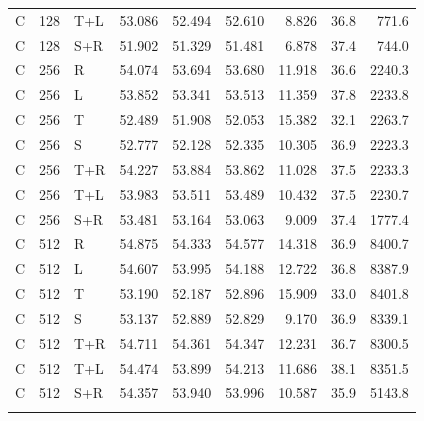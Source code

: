 \begin{longtable}{@{}lrlrrrrrr@{}}
C & 128 & T+L & 53.086 & 52.494 & 52.610 & 8.826 & 36.8 & 771.6 \\
C & 128 & S+R & 51.902 & 51.329 & 51.481 & 6.878 & 37.4 & 744.0 \\
\addlinespace
C & 256 & R & 54.074 & 53.694 & 53.680 & 11.918 & 36.6 & 2240.3 \\
C & 256 & L & 53.852 & 53.341 & 53.513 & 11.359 & 37.8 & 2233.8 \\
C & 256 & T & 52.489 & 51.908 & 52.053 & 15.382 & 32.1 & 2263.7 \\
C & 256 & S & 52.777 & 52.128 & 52.335 & 10.305 & 36.9 & 2223.3 \\
C & 256 & T+R & 54.227 & 53.884 & 53.862 & 11.028 & 37.5 & 2233.3 \\
C & 256 & T+L & 53.983 & 53.511 & 53.489 & 10.432 & 37.5 & 2230.7 \\
C & 256 & S+R & 53.481 & 53.164 & 53.063 & 9.009 & 37.4 & 1777.4 \\
\addlinespace
C & 512 & R & 54.875 & 54.333 & 54.577 & 14.318 & 36.9 & 8400.7 \\
C & 512 & L & 54.607 & 53.995 & 54.188 & 12.722 & 36.8 & 8387.9 \\
C & 512 & T & 53.190 & 52.187 & 52.896 & 15.909 & 33.0 & 8401.8 \\
C & 512 & S & 53.137 & 52.889 & 52.829 & 9.170 & 36.9 & 8339.1 \\
C & 512 & T+R & 54.711 & 54.361 & 54.347 & 12.231 & 36.7 & 8300.5 \\
C & 512 & T+L & 54.474 & 53.899 & 54.213 & 11.686 & 38.1 & 8351.5 \\
C & 512 & S+R & 54.357 & 53.940 & 53.996 & 10.587 & 35.9 & 5143.8 \\
\addlinespace
\end{longtable}
\normalsize